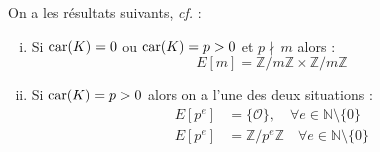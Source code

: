 \documentclass[a4paper]{article} %
\numberwithin{section}{part}
\numberwithin{equation}{section}
\newcommand\zmodn[1]{\mathbb{Z}/#1\mathbb{Z}}
\newcommand\NN{\mathbb{N}}
\newcommand\EO{\mathcal{O}}
\begin{document}
On a les résultats suivants, \emph{cf.} \cite[Cor. 6.4]{Sil}:
\vspace{0.3cm}
\begin{enumerate}[(i)]
\item Si $\textup{car}(K) = 0$ ou $\textup{car}(K) = p > 0$ et $p\nmid\,m$ 
alors :
\begin{equation}
E[m] = \zmodn{m}\times\zmodn{m}
\end{equation}
\item Si $\textup{car}(K) = p > 0$ alors on a l'une des deux situations :
    \begin{align} 
    E[p^e] &= \lbrace{\EO}\rbrace, \quad \forall
e\in\NN\setminus\lbrace{0}\rbrace\label{eq:supersingcurv}\\
    E[p^e] &= \zmodn{p^e}\quad \forall e\in\NN\setminus\lbrace{0}\rbrace
    \end{align}
\end{enumerate}
\vspace{0.3cm}
\end{document}
